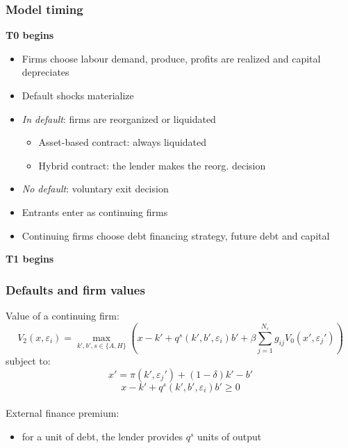 \documentclass[notes]{beamer}
\begin{document}
\begin{frame}[label = timing]
\frametitle{Model timing}
\textbf{T0 begins}
\begin{itemize} \setlength\itemsep{0em}
    \item Firms choose labour demand, produce, profits are realized and capital depreciates
    \item Default shocks materialize
    \item \textit{In default}: firms are reorganized or liquidated
    \begin{itemize}
        \item Asset-based contract: always liquidated
        \item Hybrid contract: the lender makes the reorg. decision
    \end{itemize}
    \item \textit{No default}: voluntary exit decision 
    \item Entrants enter as continuing firms
    \item Continuing firms choose debt financing strategy, future debt and capital
\end{itemize}
\textbf{T1 begins}

\end{frame}


\begin{frame}
\frametitle{Defaults and firm values}
Value of a continuing firm: 
\begin{equation*} \label{eq:V_2}
V_2(x,\varepsilon_i) = \max_{k',b', s \in \{A,H\}} \left(x - k' +  q^s(k',b',\varepsilon_i)b' + \beta \sum_{j=1}^{N_\varepsilon} g_{ij} V_0(x',\varepsilon_j') \right)
\end{equation*} 
subject to: 
\begin{equation*} \label{eq:cont_1}
x' = \pi(k',\varepsilon_j')+(1-\delta)k'-b'
\end{equation*}
$$ x - k' +  q^s(k',b',\varepsilon_i)b' \geq 0 $$\vspace{0.1mm} \\
External finance premium:
\begin{itemize}
    \item for a unit of debt, the lender provides $q^s$ units of output 
\end{itemize}

\end{frame}
\end{document}
